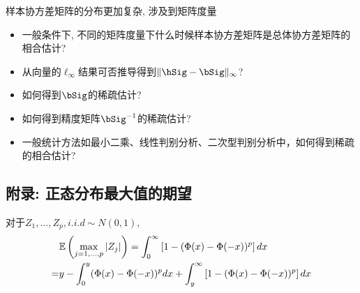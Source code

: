 \begin{remark}
	样本协方差矩阵的分布更加复杂, 涉及到矩阵度量	
	\begin{itemize}
		\item 一般条件下, 不同的矩阵度量下什么时候样本协方差矩阵是总体协方差矩阵的相合估计?
		\item 从向量的$\ell_\infty$结果可否推导得到$\|\hSig-\bSig\|_\infty$?
		\item 如何得到$\bSig$的稀疏估计?
		\item 如何得到精度矩阵$\bSig^{-1}$的稀疏估计?
		\item 一般统计方法如最小二乘、线性判别分析、二次型判别分析中，如何得到稀疏的相合估计?
	\end{itemize}
\end{remark}


\subsection{附录: 正态分布最大值的期望}
对于$Z_1,\ldots,Z_p,i.i.d \sim N(0,1)$,
\begin{align*}
	&\mathbb{E} \left( \max_{j=1,\ldots,p} |Z_j| \right)=\int_0^\infty \left[ 1-(\Phi(x)-\Phi(-x))^p\right]dx\\
	=&y-\int_0^y(\Phi(x)-\Phi(-x))^p dx +\int_y^\infty \left[ 1-(\Phi(x)-\Phi(-x))^p\right]dx
\end{align*}

